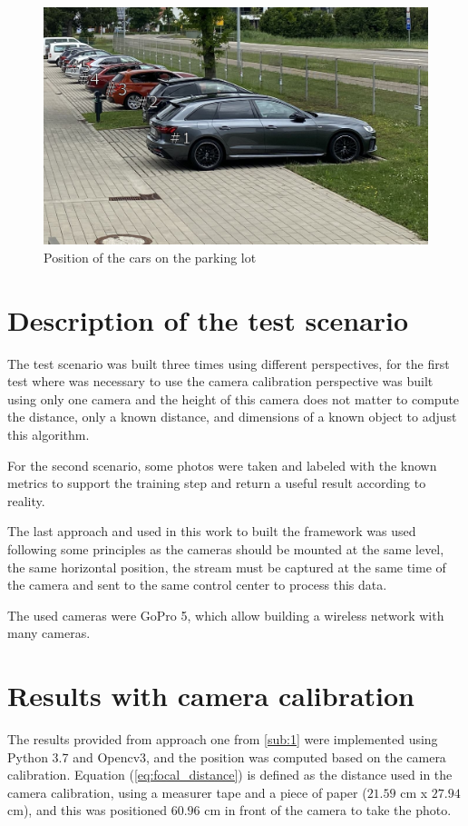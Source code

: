 \begin{figure}[H]
\centering
\includegraphics[scale=0.5]{imagens/park.JPG}
\caption{Position of the cars on the parking lot}
\label{fig:park}
\end{figure}

\section{Description of the test scenario}

The test scenario was built three times using different perspectives, for the first test where was necessary to use the camera calibration perspective was built using only one camera and the height of this camera does not matter to compute the distance, only a known distance, and dimensions of a known object to adjust this algorithm.

For the second scenario, some photos were taken and labeled with the known metrics to support the training step and return a useful result according to reality. 

The last approach and used in this work to built the framework was used following some principles as the cameras should be mounted at the same level, the same horizontal position,  the stream must be captured at the same time of the camera and sent to the same control center to process this data. 

The used cameras were GoPro 5, which allow building a wireless network with many cameras. 


\section{Results with camera calibration}

The results provided from approach one from \ref{sub:1} were implemented using Python 3.7 and Opencv3, and the position was computed based on the camera calibration. Equation (\ref{eq:focal_distance}) is defined as the distance used in the camera calibration, using a measurer tape and a piece of paper ($21.59$ cm x  $27.94$ cm), and this was positioned $60.96$ cm in front of the camera to take the photo.

